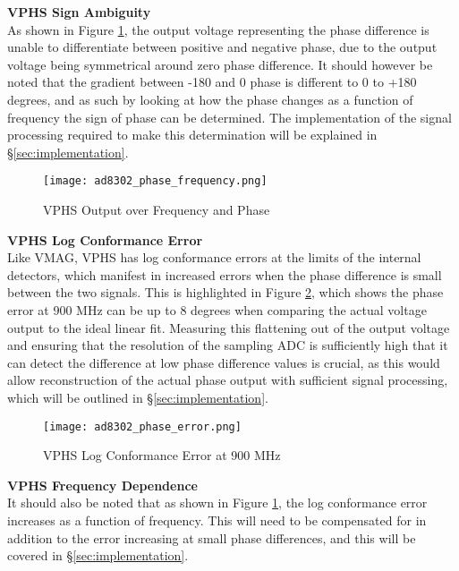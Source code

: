 \textbf{VPHS Sign Ambiguity} \\
As shown in Figure \ref{fig:ad8302_VPHS_frequency}, the output voltage representing the phase difference is unable to differentiate between positive and negative phase, due to the output voltage being symmetrical around zero phase difference. It should however be noted that the gradient between -180 and 0 phase is different to 0 to +180 degrees, and as such by looking at how the phase changes as a function of frequency the sign of phase can be determined. The implementation of the signal processing required to make this determination will be explained in \S \ref{sec:implementation}. 
\begin{figure}[H]
	\centering
	\texttt{[image: ad8302\_phase\_frequency.png]}
	\caption{VPHS Output over Frequency and Phase}
	\label{fig:ad8302_VPHS_frequency}
\end{figure}

\textbf{VPHS Log Conformance Error}\\
Like VMAG, VPHS has log conformance errors at the limits of the internal detectors, which manifest in increased errors when the phase difference is small between the two signals. This is highlighted in Figure \ref{fig:ad8302_VPHS_conformance}, which shows the phase error at 900 MHz can be up to 8 degrees when comparing the actual voltage output to the ideal linear fit. Measuring this flattening out of the output voltage and ensuring that the resolution of the sampling ADC is sufficiently high that it can detect the difference at low phase difference values is crucial, as this would allow reconstruction of the actual phase output with sufficient signal processing, which will be outlined in \S \ref{sec:implementation}. 
\begin{figure}[H]
	\centering
	\texttt{[image: ad8302\_phase\_error.png]}
	\caption{VPHS Log Conformance Error at 900 MHz}
	\label{fig:ad8302_VPHS_conformance}
\end{figure}

\textbf{VPHS Frequency Dependence} \\
It should also be noted that as shown in Figure \ref{fig:ad8302_VPHS_frequency}, the log conformance error increases as a function of frequency. This will need to be compensated for in addition to the error increasing at small phase differences, and this will be covered in \S \ref{sec:implementation}. 

